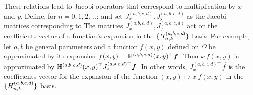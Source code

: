 These relations lead to Jacobi operators that correspond to multiplication by $x$ and $y$. Define, for $n=0,1,2,\dots$:  
and set $J_x^{(a,b,c,d)}, J_y^{(a,b,c,d)}$ as the Jacobi matrices corresponding to
The matrices $J_x^{(a,b,c,d)}, J_y^{(a,b,c,d)}$ act on the coefficients vector of a function's expansion in the $\{H_{n,k}^{(a,b,c,d)}\}$ basis. For example, let $a, b$ be general parameters and a function $f(x,y)$ defined on $\Omega$ be approximated by its expansion $f(x,y) = \mathbb{H}^{(a,b,c,d)}(x,y)^\top \bm{f}$. Then $x \: f(x,y)$ is approximated by $\mathbb{H}^{(a,b,c,d)}(x,y)^\top {J_x^{(a,b,c,d)\top}} \bm{f}$. In other words, ${J_x^{(a,b,c,d)\top}} \vec{f}$ is the coefficients vector for the expansion of the function $(x,y) \mapsto x \: f(x,y)$ in the $\{H_{n,k}^{(a,b,c,d)}\}$ basis. 

